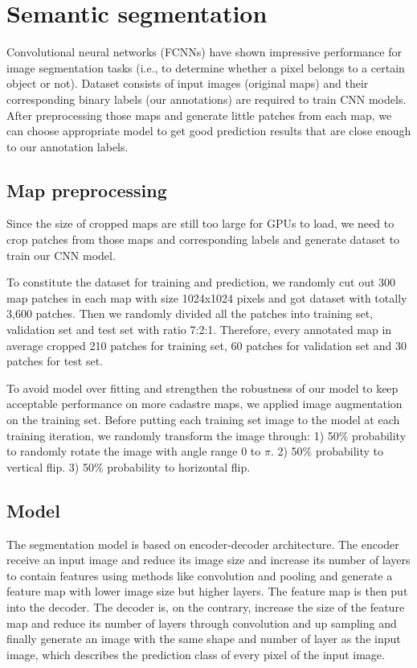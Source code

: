 \documentclass[12pt]{article}
\begin{document}
\section{Semantic segmentation}
Convolutional neural networks (FCNNs)  have  shown  impressive  performance  for  image  segmentation  tasks  (i.e.,  to  determine  whether  a  pixel  belongs  to  a  certain  object  or  not)\cite{heitzler2020cartographic}. Dataset consists of input images (original maps) and their corresponding binary labels (our annotations) are required to train CNN models. After preprocessing those maps and generate little patches from each map, we can choose appropriate model to get good prediction results that are close enough to our annotation labels. 

\subsection{Map preprocessing}
Since the size of cropped maps are still too large for GPUs to load, we need to crop patches from those maps and corresponding labels and generate dataset to train our CNN model.

To constitute the dataset for training and prediction, we randomly cut out 300 map patches in each map with size 1024x1024 pixels and got dataset with totally 3,600 patches. Then we randomly divided all the patches into training set, validation set and test set with ratio 7:2:1. Therefore, every annotated map in average cropped 210 patches for training set, 60 patches for validation set and 30 patches for test set.

To avoid model over fitting and strengthen the robustness of our model to keep acceptable performance on more cadastre maps, we applied image augmentation on the training set. Before putting each training set image to the model at each training iteration, we randomly transform the image through: 1) 50$\%$ probability to randomly rotate the image with angle range 0 to $\pi$. 2) 50$\%$ probability to vertical flip. 3) 50$\%$ probability to horizontal flip.



\subsection{Model}
The segmentation model is based on encoder-decoder architecture. The encoder receive an input image and reduce its image size and increase its number of layers to contain features using methods like convolution and pooling and generate a feature map with lower image size but higher layers. The feature map is then put into the decoder. The decoder is, on the contrary, increase the size of the feature map and reduce its number of layers through convolution and up sampling and finally generate an image with the same shape and number of layer as the input image, which describes the prediction class of every pixel of the input image. 
\end{document}
